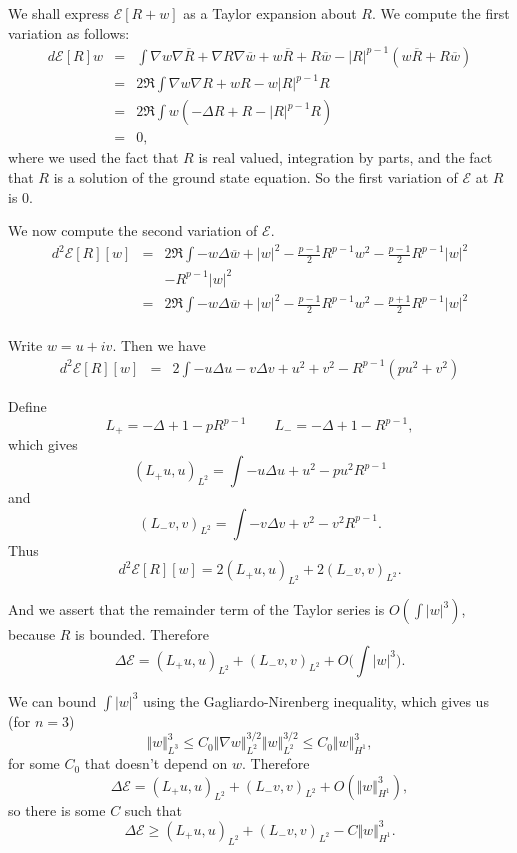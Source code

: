 \documentclass{article}
\newcommand{\norm}[1]{\Vert #1 \Vert}
\begin{document}
 We shall express $\mathscr{E}[R+w]$ as a Taylor expansion about $R$. We compute the first variation as follows:
\begin{eqnarray*}
d\mathscr{E}[R]w&=&\int \nabla w \nabla \overline{R}+\nabla R \nabla \overline{w}+w\overline{R}+
R\overline{w}-|R|^{p-1}(w\overline{R}+R\overline{w})\\
&=&2\Re \int \nabla w \nabla R+wR-w|R|^{p-1}R\\
&=&2\Re \int w(-\Delta R+R-|R|^{p-1}R)\\
&=&0,
\end{eqnarray*}
where we used the fact that $R$ is real valued, integration by parts, and the fact that $R$ is a solution
of the ground state equation.
So the first variation of $\mathscr{E}$ at $R$ is $0$.

We now compute the second variation of $\mathscr{E}$. 
\begin{eqnarray*}
d^2 \mathscr{E}[R][w]&=&2\Re\int -w\Delta \overline{w}+|w|^2-\frac{p-1}{2}R^{p-1}w^2
-\frac{p-1}{2}R^{p-1}|w|^2\\
&&-R^{p-1}|w|^2\\
&=&2\Re\int -w\Delta \overline{w}+|w|^2-\frac{p-1}{2}R^{p-1}w^2
-\frac{p+1}{2}R^{p-1}|w|^2\\
\end{eqnarray*}

Write $w=u+iv$. Then we have
\begin{eqnarray*}
d^2 \mathscr{E}[R][w]&=&2\int -u\Delta u -v\Delta v + u^2 +v^2 -R^{p-1}(pu^2+v^2)
\end{eqnarray*}

Define
\[
L_+=-\Delta+1-pR^{p-1} \qquad L_-=-\Delta+1-R^{p-1},
\]
which gives
\[
(L_+ u,u)_{L^2}=\int -u\Delta u + u^2 -pu^2 R^{p-1}
\]
and
\[
(L_-v,v)_{L^2}=\int -v\Delta v +v^2 - v^2 R^{p-1}.
\]
Thus
\[
d^2 \mathscr{E}[R][w]=2(L_+ u,u)_{L^2}+2(L_-v,v)_{L^2}.
\]

And we assert that the remainder term of the Taylor series is $O(\int |w|^3)$, because $R$ is bounded. Therefore
\[
\Delta \mathscr{E}=(L_+ u,u)_{L^2}+(L_-v,v)_{L^2}+O\Big(\int |w|^3\Big).
\]

We can bound $\int |w|^3$ using the Gagliardo-Nirenberg inequality, which gives us (for
$n=3$)
\[
\norm{w}_{L^3}^3 \leq C_0 \norm{\nabla w}_{L^2}^{3/2} \norm{w}_{L^2}^{3/2}
\leq C_0 \norm{w}_{H^1}^3,
\]
for some $C_0$ that doesn't depend on $w$.
Therefore
\[
\Delta \mathscr{E}=(L_+ u,u)_{L^2}+(L_-v,v)_{L^2}+O(\norm{w}_{H^1}^3),
\]
so there is some $C$ such that
\[
\Delta \mathscr{E} \geq (L_+ u,u)_{L^2}+(L_-v,v)_{L^2}-C\norm{w}_{H^1}^3.
\]
\end{document}
